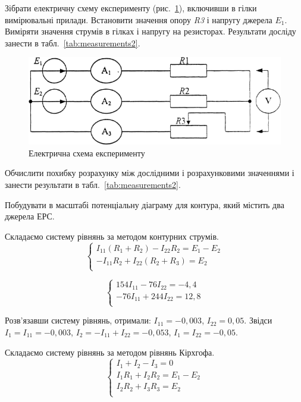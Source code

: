 \documentclass[a4paper,oneside,DIV=10,12pt]{scrartcl}
\newcommand\schel[1]{\textit{#1}}
\begin{document}
			Зібрати електричну схему експерименту (рис.~\ref{fig:schematic02}), включивши в гілки вимірювальні прилади. Встановити значення опору \schel{R3} і напругу джерела \schel{$E_1$}. Виміряти значення струмів в гілках і напругу на резисторах. Результати досліду занести в табл.~\ref{tab:measurements2}.
			
			\begin{figure}[!htbp]
				\centering
				\includegraphics[width=\textwidth]{schematic-02.png}
				\caption{Електрична схема експерименту}
				\label{fig:schematic02}
			\end{figure}
			
			Обчислити похибку розрахунку між дослідними і розрахунковими значеннями і занести результати в табл.~\ref{tab:measurements2}.
			
			Побудувати в масштабі потенціальну діаграму для контура, який містить два джерела ЕРС.
			
			Складаємо систему рівнянь за методом контурних струмів.
			\[
				\begin{cases}
					 I_{11} (R_1 + R_2) - I_{22}  R_2        = E_1 - E_2\\
					-I_{11} R_2         + I_{22} (R_2 + R_3) = E_2\\
				\end{cases}
			\]
			
			\[
				\begin{cases}
					 154 I_{11} -  76 I_{22} = -4{,}4\\
					-76  I_{11} + 244 I_{22} = 12{,}8\\
				\end{cases}
			\]
			
			Розв'язавши систему рівнянь, отримали: $I_{11} = -0{,}003$, $I_{22} = 0{,}05$. Звідси $I_1 = I_{11} = -0{,}003$, $I_2 = -I_{11} + I_{22} = -0{,}053$, $I_1 = I_{22} = -0{,}05$.
			
			Складаємо систему рівнянь за методом рівнянь Кірхгофа.
			\[
				\begin{cases}
					I_1 + I_2 - I_3 = 0\\
					I_1 R_1 + I_2 R_2 = E_1 - E_2\\
					I_2 R_2 + I_3 R_3 = E_2\\
				\end{cases}
			\]
\end{document}
